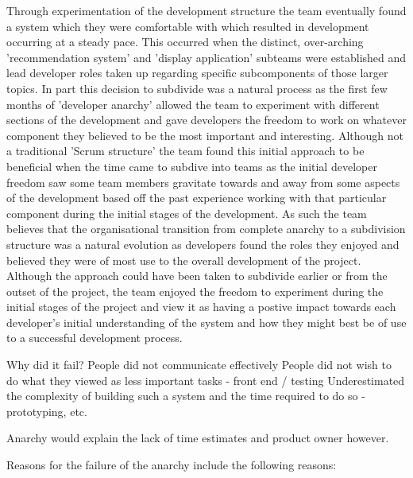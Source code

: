 \documentclass{l3proj}
\begin{document}
Through experimentation of the development structure the team eventually found a system which they were comfortable with which resulted in development occurring at a steady pace. This occurred when the distinct, over-arching 'recommendation system' and 'display application' subteams were established and lead developer roles taken up regarding specific subcomponents of those larger topics. In part this decision to subdivide was a natural process as the first few months of 'developer anarchy' allowed the team to experiment with different sections of the development and gave developers the freedom to work on whatever component they believed to be the most important and interesting. Although not a traditional 'Scrum structure' the team found this initial approach to be beneficial when the time came to subdive into teams as the initial developer freedom saw some team members gravitate towards and away from some aspects of the development based off the past experience working with that particular component during the initial stages of the development. As such the team believes that the organisational transition from complete anarchy to a subdivision structure was a natural evolution as developers found the roles they enjoyed and believed they were of most use to the overall development of the project. Although the approach could have been taken to subdivide earlier or from the outset of the project, the team enjoyed the freedom to experiment during the initial stages of the project and view it as having a postive impact towards each developer's initial understanding of the system and how they might best be of use to a successful development process. 


Why did it fail?
People did not communicate effectively
People did not wish to do what they viewed as less important tasks - front end / testing
Underestimated the complexity of building such a system and the time required to do so - prototyping, etc.

Anarchy would explain the lack of time estimates and product owner however.

Reasons for the failure of the anarchy include the following reasons:
\end{document}
